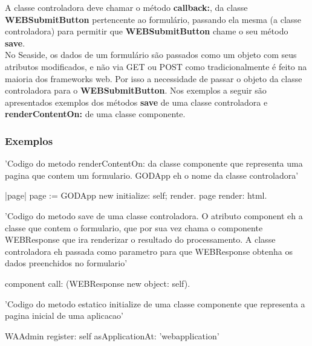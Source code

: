 A classe controladora deve chamar o método \textbf{callback:}, da classe \textbf{WEBSubmitButton} pertencente ao formulário, passando ela mesma (a classe controladora) para permitir 
que \textbf{WEBSubmitButton} chame o seu método \textbf{save}. \\

No Seaside, os dados de um formulário são passados como um objeto com seus atributos modificados, e não via GET ou POST como tradicionalmente é feito na maioria dos frameworks web. 
Por isso a necessidade de passar o objeto da classe controladora para o \textbf{WEBSubmitButton}. Nos exemplos a seguir são apresentados exemplos dos métodos \textbf{save} de 
uma classe controladora e \textbf{renderContentOn:} de uma classe componente.


\subsubsection{Exemplos}

\begin{godCode}
'Codigo do metodo renderContentOn: da classe componente que representa uma pagina que contem um formulario. GODApp eh o nome da classe controladora'

|page|
page := GODApp new initialize: self; render.	
page render: html.

'Codigo do metodo save de uma classe controladora. O atributo component eh a classe que contem o formulario, que por sua vez chama o componente WEBResponse que ira 
renderizar o resultado do processamento. A classe controladora eh passada como parametro para que WEBResponse obtenha os dados preenchidos no formulario'

component call: (WEBResponse new object: self).

'Codigo do metodo estatico initialize de uma classe componente que representa a pagina inicial de uma aplicacao'

	WAAdmin register: self asApplicationAt: 'webapplication'

\end{godCode}